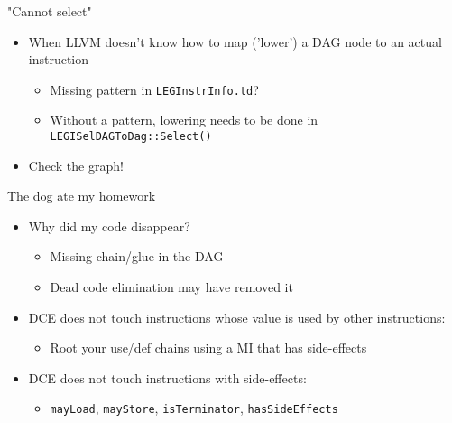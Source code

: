 
\begin{frame}{"Cannot select"}

\begin{itemize}
    \item When LLVM doesn't know how to map ('lower') a DAG node to an actual instruction
    \begin{itemize}
        \item Missing pattern in \texttt{LEGInstrInfo.td}?
        \item Without a pattern, lowering needs to be done in \texttt{LEGISelDAGToDag::Select()}
    \end{itemize}
    \item Check the graph!
\end{itemize}

\end{frame}


\begin{frame}{The dog ate my homework}

\begin{itemize}
    \item Why did my code disappear?
    \begin{itemize}
        \item Missing chain/glue in the DAG
        \item Dead code elimination may have removed it
    \end{itemize}
    \item DCE does not touch instructions whose value is used by other instructions:
    \begin{itemize}
        \item Root your use/def chains using a MI that has side-effects
    \end{itemize}
    \item DCE does not touch instructions with side-effects:
    \begin{itemize}
        \item \texttt{mayLoad}, \texttt{mayStore}, \texttt{isTerminator}, \texttt{hasSideEffects}
    \end{itemize}
\end{itemize}

\end{frame}

